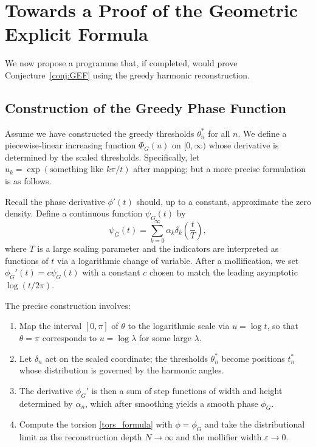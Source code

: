 \documentclass[12pt,a4paper,oneside]{book}
\begin{document}
\chapter{Towards a Proof of the Geometric Explicit Formula}

We now propose a programme that, if completed, would prove Conjecture~\ref{conj:GEF} using the greedy harmonic reconstruction.

\section{Construction of the Greedy Phase Function}
Assume we have constructed the greedy thresholds \(\theta_n^*\) for all \(n\).  We define a piecewise‑linear increasing function \(\Phi_G(u)\) on \([0,\infty)\) whose derivative is determined by the scaled thresholds.  Specifically, let \(u_k = \exp( \text{something like } k\pi/t )\) after mapping; but a more precise formulation is as follows.

Recall the phase derivative \(\phi'(t)\) should, up to a constant, approximate the zero density.  Define a continuous function \(\psi_G(t)\) by
\[
\psi_G(t) = \sum_{k=0}^{\infty} \alpha_k \delta_k\!\left( \frac{t}{T} \right),
\]
where \(T\) is a large scaling parameter and the indicators are interpreted as functions of \(t\) via a logarithmic change of variable.  After a mollification, we set \(\phi_G'(t) = c\psi_G(t)\) with a constant \(c\) chosen to match the leading asymptotic \(\log(t/2\pi)\).

The precise construction involves:
\begin{enumerate}
\item Map the interval \([0,\pi]\) of \(\theta\) to the logarithmic scale via \(u = \log t\), so that \(\theta = \pi\) corresponds to \(u = \log \lambda\) for some large \(\lambda\).
\item Let \(\delta_n\) act on the scaled coordinate; the thresholds \(\theta_n^*\) become positions \(t_n^*\) whose distribution is governed by the harmonic angles.
\item The derivative \(\phi_G'\) is then a sum of step functions of width and height determined by \(\alpha_n\), which after smoothing yields a smooth phase \(\phi_G\).
\item Compute the torsion \eqref{tors_formula} with \(\phi=\phi_G\) and take the distributional limit as the reconstruction depth \(N\to\infty\) and the mollifier width \(\varepsilon\to0\).
\end{enumerate}
\end{document}
